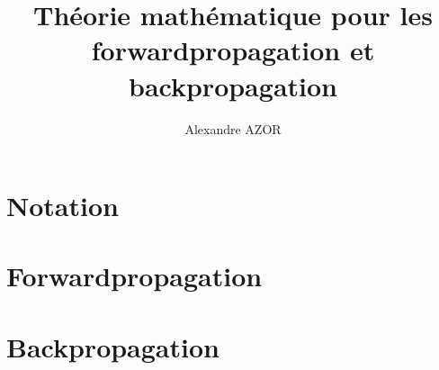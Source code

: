 \documentclass[12pt]{article}
\begin{document}
	\author{Alexandre \textsc{AZOR}}
	\title{Théorie mathématique pour les forwardpropagation et backpropagation}
	\maketitle
	
	\section{Notation}
		
		
	\section{Forwardpropagation}
		
		
	\section{Backpropagation}
		
		
	
\end{document}
